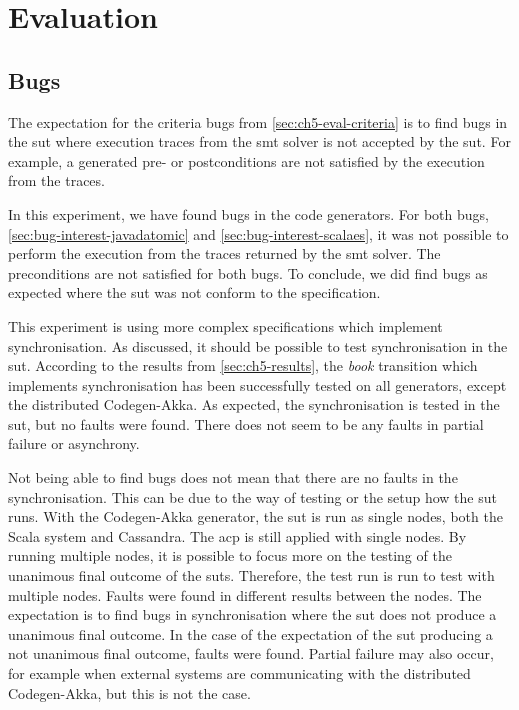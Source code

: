 \section{Evaluation}\label{sec:ch5-evaluation}

\subsection{Bugs}
The expectation for the criteria bugs from \autoref{sec:ch5-eval-criteria} is to
find bugs in the \gls{sut} where execution traces from the \gls{smt} solver
is not accepted by the \gls{sut}. For example, a generated pre- or postconditions
are not satisfied by the execution from the traces.

In this experiment, we have found bugs in the code generators. For both bugs,
\autoref{sec:bug-interest-javadatomic} and \autoref{sec:bug-interest-scalaes},
it was not possible to perform the execution from the traces returned by the
\gls{smt} solver. The preconditions are not satisfied for both bugs. To conclude,
we did find bugs as expected where the \gls{sut} was not conform to the
specification.

This experiment is using more complex specifications which implement
synchronisation. As discussed, it should be possible to test synchronisation in
the \gls{sut}. According to the results from \autoref{sec:ch5-results}, the
\textit{book} transition which implements synchronisation has been successfully
tested on all generators, except the distributed Codegen-Akka. As expected, the
synchronisation is tested in the \gls{sut}, but no faults were found. There does
not seem to be any faults in partial failure or asynchrony.

Not being able to find bugs does not mean that there are no faults in the
synchronisation. This can be due to the way of testing or the setup how the
\gls{sut} runs. With the Codegen-Akka generator, the \gls{sut} is run as single
nodes, both the Scala system and Cassandra.
The \gls{acp} is still applied with single nodes. By running multiple nodes, it
is possible to focus more on the testing of the unanimous final outcome of the
\gls{sut}s.
Therefore, the test run \label{sec:bug-dist-nodes} is run to test with multiple
nodes. Faults were found in different results between the nodes.
The expectation is to find bugs in synchronisation where the \gls{sut} does not
produce a unanimous final outcome. In the case of the expectation of the
\gls{sut} producing a not unanimous final outcome, faults were found.
Partial failure may also occur, for example when external systems are
communicating with the distributed Codegen-Akka, but this is not the case.

